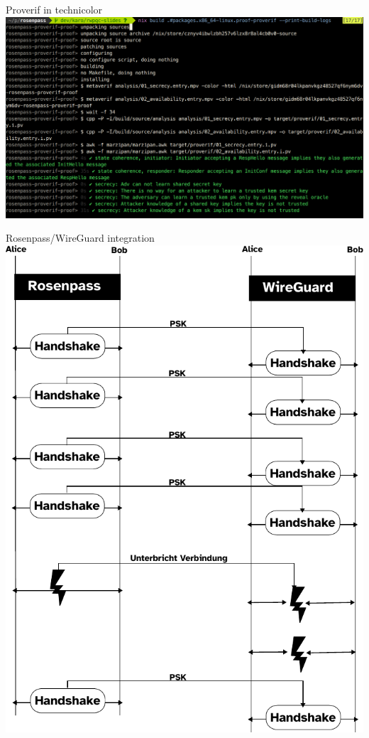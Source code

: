 \documentclass{rosenpass-beamer}
\begin{document}
\begin{frame}{Proverif in technicolor}
  \includegraphics[height=.9\textheight]{assets/2023-03-20-symbolic-analysis-screenshot.png}
\end{frame}

\begin{frame}{Rosenpass/WireGuard integration}
  \includegraphics[height=.9\textheight]{graphics/rpwg.pdf}
\end{frame}
\end{document}
